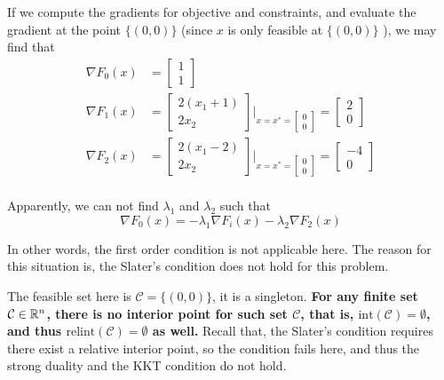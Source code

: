 \begin{example}
If we compute the gradients for objective and constraints, and evaluate the gradient at the point $\{(0, 0)\}$ (since $x$ is only feasible at $\{(0, 0)\}$ ), we may find that
\begin{align*}
\nabla F_0(x) &=
\begin{bmatrix}
1\\
1
\end{bmatrix}\\
\nabla F_1(x) &=
\begin{bmatrix}
2(x_1+1)\\
2x_2
\end{bmatrix}
|_{x=x^*=
	\begin{bmatrix}
	0\\
	0
	\end{bmatrix}
}=
\begin{bmatrix}
2\\
0
\end{bmatrix}\\
\nabla F_2(x) &=
\begin{bmatrix}
2(x_1-2)\\
2x_2
\end{bmatrix}
|_{x=x^*=
	\begin{bmatrix}
	0\\
	0
	\end{bmatrix}
}=
\begin{bmatrix}
-4\\
0
\end{bmatrix}\\
\end{align*}

Apparently, we can not find $\lambda_1$ and $\lambda_2$ such that 
$$\nabla F_0(x) =-\lambda_1\nabla F_i(x) -\lambda_2 \nabla F_2(x) $$

In other words, the first order condition is not applicable here. The reason for this situation is, the Slater's condition does not hold for this problem.

The feasible set here is $\mathcal{C}=\{(0, 0)\}$, it is a singleton. \textbf{For any finite set $\mathcal{C}\in\mathbb{R}^{n}$, there is no interior point for such set $\mathcal{C}$, that is, $\text{int}(\mathcal{C}) =\emptyset$, and thus $\text{relint}(\mathcal{C}) =\emptyset$ as well.} Recall that, the Slater's condition requires there exist a relative interior point, so the condition fails here, and thus the strong duality and the KKT condition do not hold.


\end{example}


